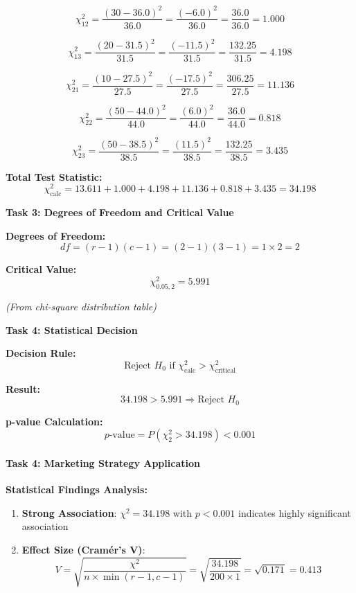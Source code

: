 \documentclass[11pt]{article}
\providecommand{\tightlist}{%
      \setlength{\itemsep}{0pt}\setlength{\parskip}{0pt}}
\begin{document}
\[\chi^2_{12} = \frac{(30 - 36.0)^2}{36.0} = \frac{(-6.0)^2}{36.0} = \frac{36.0}{36.0} = 1.000\]

\[\chi^2_{13} = \frac{(20 - 31.5)^2}{31.5} = \frac{(-11.5)^2}{31.5} = \frac{132.25}{31.5} = 4.198\]

\[\chi^2_{21} = \frac{(10 - 27.5)^2}{27.5} = \frac{(-17.5)^2}{27.5} = \frac{306.25}{27.5} = 11.136\]

\[\chi^2_{22} = \frac{(50 - 44.0)^2}{44.0} = \frac{(6.0)^2}{44.0} = \frac{36.0}{44.0} = 0.818\]

\[\chi^2_{23} = \frac{(50 - 38.5)^2}{38.5} = \frac{(11.5)^2}{38.5} = \frac{132.25}{38.5} = 3.435\]

\textbf{Total Test Statistic:}
\[\chi^2_{\text{calc}} = 13.611 + 1.000 + 4.198 + 11.136 + 0.818 + 3.435 = 34.198\]

\textbf{Task 3: Degrees of Freedom and Critical Value}

\textbf{Degrees of Freedom:}
\[df = (r - 1)(c - 1) = (2 - 1)(3 - 1) = 1 \times 2 = 2\]

\textbf{Critical Value:} \[\chi^2_{0.05, 2} = 5.991\]

\emph{(From chi-square distribution table)}

\textbf{Task 4: Statistical Decision}

\textbf{Decision Rule:}
\[\text{Reject } H_0 \text{ if } \chi^2_{\text{calc}} > \chi^2_{\text{critical}}\]

\textbf{Result:} \[34.198 > 5.991 \Rightarrow \text{Reject } H_0\]

\textbf{p-value Calculation:}
\[p\text{-value} = P(\chi^2_2 > 34.198) < 0.001\]

\paragraph{Task 4: Marketing Strategy
Application}\label{task-4-marketing-strategy-application}

\textbf{Statistical Findings Analysis:}

\begin{enumerate}
\def\labelenumi{\arabic{enumi}.}
\tightlist
\item
  \textbf{Strong Association}: \(\chi^2 = 34.198\) with \(p < 0.001\)
  indicates highly significant association
\item
  \textbf{Effect Size (Cramér's V)}:
  \[V = \sqrt{\frac{\chi^2}{n \times \min(r-1, c-1)}} = \sqrt{\frac{34.198}{200 \times 1}} = \sqrt{0.171} = 0.413\]
\end{enumerate}
\end{document}
